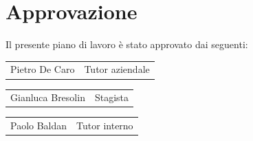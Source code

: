\documentclass[a4paper, 12pt]{article}
\begin{document}
\newpage
\section{Approvazione}
 {Il presente piano di lavoro è stato approvato dai seguenti:}

\vspace*{2cm}
\begin{tabular}{p{4cm}p{4cm}}
                   &                 \\ \hline
    Pietro De Caro & Tutor aziendale
\end{tabular}

\vspace*{2cm}
\begin{tabular}{p{4cm}p{4cm}}
                      &          \\ \hline
    Gianluca Bresolin & Stagista
\end{tabular}

\vspace*{2cm}
\begin{tabular}{p{4cm}p{4cm}}
                 &               \\ \hline
    Paolo Baldan & Tutor interno
\end{tabular}
\end{document}
